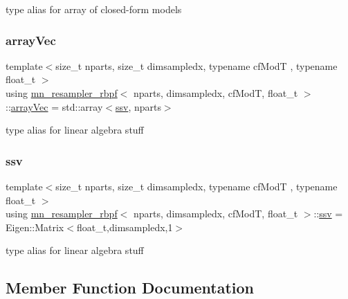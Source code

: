 type alias for array of closed-\/form models \mbox{\label{classmn__resampler__rbpf_a9eddf10f48c19b555276bbd23826044b}} 
\subsubsection{\texorpdfstring{array\+Vec}{arrayVec}}
{\footnotesize\ttfamily template$<$size\+\_\+t nparts, size\+\_\+t dimsampledx, typename cf\+ModT , typename float\+\_\+t $>$ \\
using \hyperlink{classmn__resampler__rbpf}{mn\+\_\+resampler\+\_\+rbpf}$<$ nparts, dimsampledx, cf\+ModT, float\+\_\+t $>$\+::\hyperlink{classmn__resampler__rbpf_a9eddf10f48c19b555276bbd23826044b}{array\+Vec} =  std\+::array$<$\hyperlink{classmn__resampler__rbpf_aff8bcd12cfe60425c4406262a9640d68}{ssv}, nparts$>$}

type alias for linear algebra stuff \mbox{\label{classmn__resampler__rbpf_aff8bcd12cfe60425c4406262a9640d68}} 
\subsubsection{\texorpdfstring{ssv}{ssv}}
{\footnotesize\ttfamily template$<$size\+\_\+t nparts, size\+\_\+t dimsampledx, typename cf\+ModT , typename float\+\_\+t $>$ \\
using \hyperlink{classmn__resampler__rbpf}{mn\+\_\+resampler\+\_\+rbpf}$<$ nparts, dimsampledx, cf\+ModT, float\+\_\+t $>$\+::\hyperlink{classmn__resampler__rbpf_aff8bcd12cfe60425c4406262a9640d68}{ssv} =  Eigen\+::\+Matrix$<$float\+\_\+t,dimsampledx,1$>$}

type alias for linear algebra stuff 

\subsection{Member Function Documentation}
\mbox{\label{classmn__resampler__rbpf_a1ae1ffd0262e853c601659509fa5e8ea}} 
